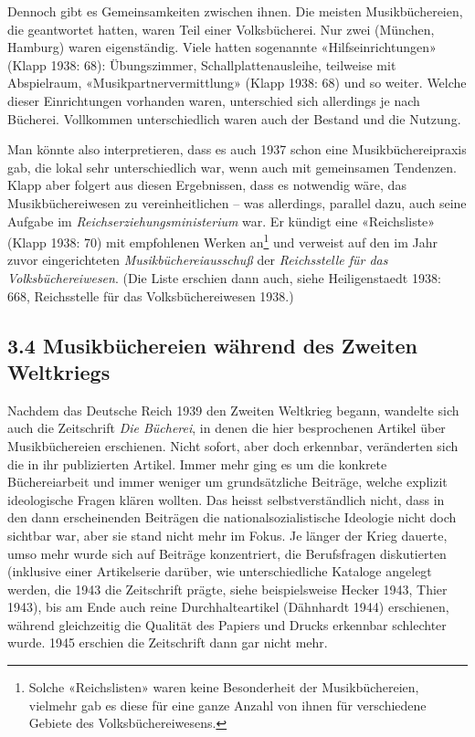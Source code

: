 \documentclass[a4paper,
fontsize=11pt,
oneside,
numbers=noperiodatend,
parskip=half-,
bibliography=totoc,
final
]{scrartcl}
\begin{document}
Dennoch gibt es Gemeinsamkeiten zwischen ihnen. Die meisten
Musikbüchereien, die geantwortet hatten, waren Teil einer Volksbücherei.
Nur zwei (München, Hamburg) waren eigenständig. Viele hatten sogenannte
«Hilfseinrichtungen» (Klapp 1938: 68): Übungszimmer,
Schallplattenausleihe, teilweise mit Abspielraum,
«Musikpartnervermittlung» (Klapp 1938: 68) und so weiter. Welche dieser
Einrichtungen vorhanden waren, unterschied sich allerdings je nach
Bücherei. Vollkommen unterschiedlich waren auch der Bestand und die
Nutzung.

Man könnte also interpretieren, dass es auch 1937 schon eine
Musikbüchereipraxis gab, die lokal sehr unterschiedlich war, wenn auch
mit gemeinsamen Tendenzen. Klapp aber folgert aus diesen Ergebnissen,
dass es notwendig wäre, das Musikbüchereiwesen zu vereinheitlichen --
was allerdings, parallel dazu, auch seine Aufgabe im
\emph{Reichserziehungsministerium} war. Er kündigt eine «Reichsliste»
(Klapp 1938: 70) mit empfohlenen Werken an\footnote{Solche
  «Reichslisten» waren keine Besonderheit der Musikbüchereien, vielmehr
  gab es diese für eine ganze Anzahl von ihnen für verschiedene Gebiete
  des Volksbüchereiwesens.} und verweist auf den im Jahr zuvor
eingerichteten \emph{Musikbüchereiausschuß} der \emph{Reichsstelle für
das Volksbüchereiwesen}. (Die Liste erschien dann auch, siehe
Heiligenstaedt 1938: 668, Reichsstelle für das Volksbüchereiwesen 1938.)

\hypertarget{musikbuxfcchereien-wuxe4hrend-des-zweiten-weltkriegs}{%
\subsection{3.4 Musikbüchereien während des Zweiten
Weltkriegs}\label{musikbuxfcchereien-wuxe4hrend-des-zweiten-weltkriegs}}

Nachdem das Deutsche Reich 1939 den Zweiten Weltkrieg begann, wandelte
sich auch die Zeitschrift \emph{Die Bücherei}, in denen die hier
besprochenen Artikel über Musikbüchereien erschienen. Nicht sofort, aber
doch erkennbar, veränderten sich die in ihr publizierten Artikel. Immer
mehr ging es um die konkrete Büchereiarbeit und immer weniger um
grundsätzliche Beiträge, welche explizit ideologische Fragen klären
wollten. Das heisst selbstverständlich nicht, dass in den dann
erscheinenden Beiträgen die nationalsozialistische Ideologie nicht doch
sichtbar war, aber sie stand nicht mehr im Fokus. Je länger der Krieg
dauerte, umso mehr wurde sich auf Beiträge konzentriert, die
Berufsfragen diskutierten (inklusive einer Artikelserie darüber, wie
unterschiedliche Kataloge angelegt werden, die 1943 die Zeitschrift
prägte, siehe beispielsweise Hecker 1943, Thier 1943), bis am Ende auch
reine Durchhalteartikel (Dähnhardt 1944) erschienen, während
gleichzeitig die Qualität des Papiers und Drucks erkennbar schlechter
wurde. 1945 erschien die Zeitschrift dann gar nicht mehr.
\end{document}
